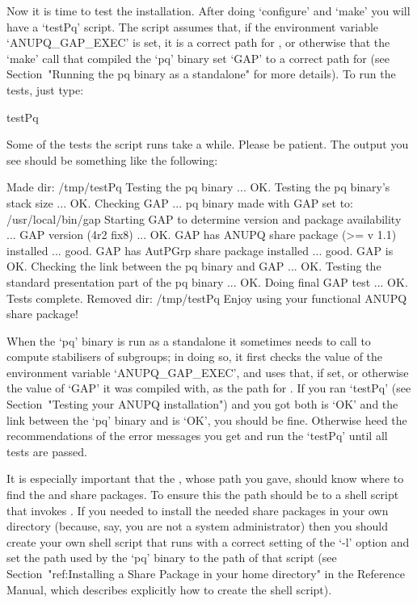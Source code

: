 
Now it is time to test the  installation.  After  doing  `configure'  and
`make' you will have a `testPq' script. The script assumes that,  if  the
environment variable `ANUPQ_GAP_EXEC' is set, it is a  correct  path  for
{\GAP}, or otherwise that the `make' call that compiled the  `pq'  binary
set `GAP' to a correct path  for  {\GAP}  (see  Section~"Running  the  pq
binary as a standalone" for more details). To run the tests, just type:

\begintt
testPq
\endtt

Some of the tests the script runs take a while. Please  be  patient.  The
output you see should be something like the following:

\begintt
Made dir: /tmp/testPq
Testing the pq binary ... OK.
Testing the pq binary's stack size ... OK.
Checking GAP ...
 pq binary made with GAP set to: /usr/local/bin/gap
 Starting GAP to determine version and package availability ...
  GAP version (4r2 fix8) ... OK.
  GAP has ANUPQ share package (>= v 1.1) installed ... good.
  GAP has AutPGrp share package installed ... good.
 GAP is OK.
Checking the link between the pq binary and GAP ... OK.
Testing the standard presentation part of the pq binary ... OK.
Doing final GAP test ... OK.
Tests complete.
Removed dir: /tmp/testPq
Enjoy using your functional ANUPQ share package!
\endtt


When the `pq' binary is run as a standalone it sometimes  needs  to  call
{\GAP} to compute stabilisers of subgroups; in doing so, it first  checks
the value of the environment variable `ANUPQ_GAP_EXEC', and uses that, if
set, or otherwise the value of `GAP' it was compiled with,  as  the  path
for  {\GAP}.  If  you  ran  `testPq'  (see  Section~"Testing  your  ANUPQ
installation") and you got both {\GAP} is `OK' and the link  between  the
`pq' binary and {\GAP} is `OK', you should be fine.  Otherwise  heed  the
recommendations of the error messages you get and run the `testPq'  until
all tests are passed.

It is especially important that the {\GAP}, whose path you  gave,  should
know where to find the {\ANUPQ} and {\AutPGrp} share packages. To  ensure
this the path should be to a shell script that  invokes  {\GAP}.  If  you
needed to install  the  needed  share  packages  in  your  own  directory
(because, say, you are not a system administrator) then you should create
your own shell script that runs {\GAP} with a correct setting of the `-l'
option and set the path used by the `pq'  binary  to  the  path  of  that
script  (see  Section~"ref:Installing  a  Share  Package  in  your   home
directory" in the Reference Manual, which  describes  explicitly  how  to
create the shell script).

